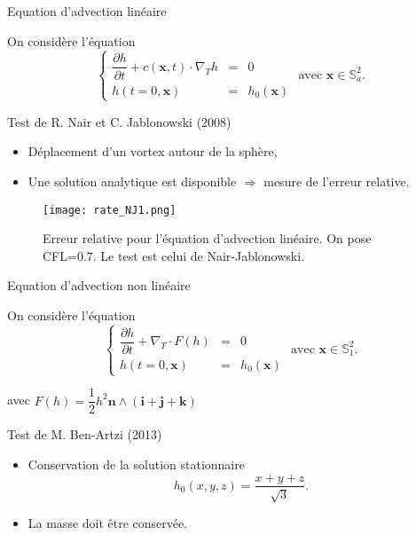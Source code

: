 \documentclass[11pt]{beamer}
\begin{document}
\begin{frame}{Equation d'advection linéaire}

On considère l'équation
$$
\left\lbrace
\begin{array}{rcl}
\dfrac{\partial h}{\partial t} + c(\mathbf{x},t) \cdot \nabla_T h & = & 0  \\
h(t=0,\mathbf{x}) & = & h_0(\mathbf{x})
\end{array}
\right. \text{ avec } \mathbf{x} \in \mathbb{S}_a^2.
$$

\begin{exampleblock}{Test de R. Nair et C. Jablonowski (2008)}
\begin{itemize}
\item Déplacement d'un vortex autour de la sphère,
\item Une solution analytique est disponible $\Rightarrow$ mesure de l'erreur relative.
\end{itemize}
\end{exampleblock}
\end{frame}


\begin{frame}
\begin{figure}
\begin{center}
\texttt{[image: rate\_NJ1.png]}
\end{center}
\caption{Erreur relative pour l'équation d'advection linéaire. On pose CFL=0.7. Le test est celui de Nair-Jablonowski.}
\end{figure}
\end{frame}

















\begin{frame}{Equation d'advection non linéaire}

On considère l'équation
$$
\left\lbrace
\begin{array}{rcl}
\dfrac{\partial h}{\partial t} + \nabla_T \cdot F(h) & = & 0  \\
h(t=0,\mathbf{x}) & = & h_0(\mathbf{x})
\end{array}
\right. \text{ avec } \mathbf{x} \in \mathbb{S}_1^2.
$$

avec $F(h) = \dfrac{1}{2} h^2 \mathbf{n} \wedge (\mathbf{i} + \mathbf{j} + \mathbf{k})$ 

\begin{exampleblock}{Test de M. Ben-Artzi  (2013)}
\begin{itemize}
\item Conservation de la solution stationnaire 
$$
h_0(x,y,z) = \dfrac{x+y+z}{\sqrt{3}}.
$$
\item La masse doit être conservée.
\end{itemize}
\end{exampleblock}
\end{frame}
\end{document}
